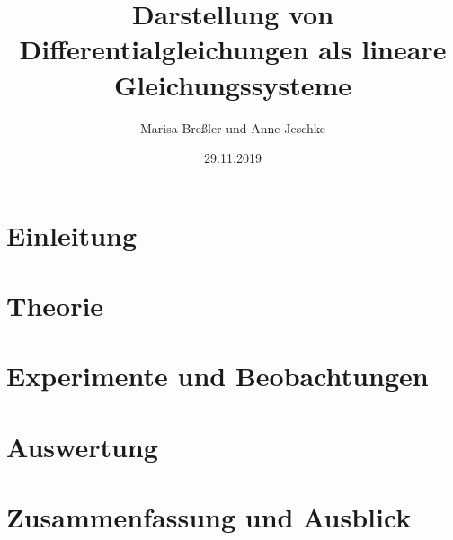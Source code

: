 \documentclass{scrartcl}
\begin{document}
\title{Darstellung von Differentialgleichungen als lineare Gleichungssysteme}
\author{Marisa Breßler und Anne Jeschke}
\date{29.11.2019}
\maketitle
\tableofcontents
\pagebreak \section{Einleitung}
\label{sec:einleitung}


\pagebreak \section{Theorie}
\label{sec:theorie}

\pagebreak \section{Experimente und Beobachtungen}
\label{sec:experimente}


\pagebreak \section{Auswertung}
\label{sec:auswertung}

\pagebreak \section{Zusammenfassung und Ausblick}
\label{sec:zusammenfassung}

\pagebreak


\end{document}
